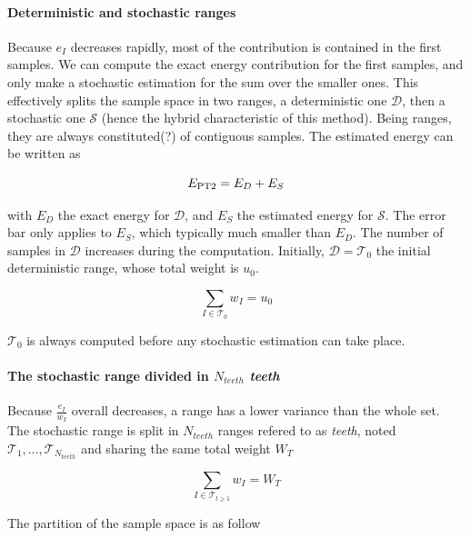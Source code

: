 \documentclass[./thesis.tex]{subfiles}
\begin{document}
\paragraph{Deterministic and stochastic ranges}
Because $e_I$ decreases rapidly, most of the contribution is contained in the first samples. We can compute the exact energy contribution for the first samples, and only make a stochastic estimation for the sum over the smaller ones. This effectively splits the sample space in two ranges, a deterministic one $\mathcal{D}$, then a stochastic one $\mathcal{S}$ (hence the hybrid characteristic of this method). Being ranges, they are always constituted(?) of contiguous samples. The estimated energy can be written as

\begin{equation}
E_\text{PT2} = E_D + E_S
\end{equation}

with $E_D$ the exact energy for $\mathcal{D}$, and $E_S$ the estimated energy for $\mathcal{S}$. The error bar only applies to $E_S$, which typically much smaller than $E_D$.
The number of samples in $\mathcal{D}$ increases during the computation. Initially, $\mathcal{D}=\mathcal{T}_0$ the initial deterministic range, whose total weight is $u_0$.

\begin{equation}
\sum_{I \in \mathcal{T}_0} w_I=u_0
\end{equation}

$\mathcal{T}_0$ is always computed before any stochastic estimation can take place.

\paragraph{The stochastic range divided in $N_{teeth}$ \emph{teeth}}

Because $\frac{e_I}{w_I}$ overall decreases, a range has a lower variance than the whole set. The stochastic range is split in $N_{teeth}$ ranges refered to as \emph{teeth}, noted $\mathcal{T}_1,\ldots,\mathcal{T}_{N_{teeth}}$ and sharing the same total weight $W_T$

\begin{equation}
\sum_{I \in \mathcal{T}_{t \geq 1}} w_I=W_T
\end{equation}

The partition of the sample space is as follow
\end{document}
